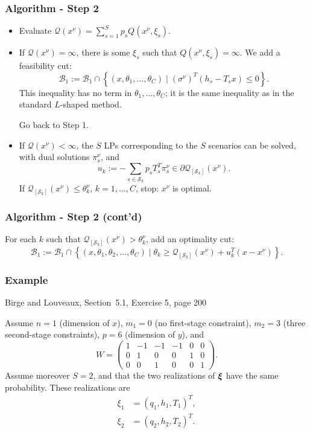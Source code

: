 \documentclass[aspectratio=169]{beamer}
\begin{document}
\begin{frame}
\frametitle{Algorithm - Step 2}

\begin{itemize}
\item
Evaluate $\mathcal{Q}(x^{\nu}) = \sum_{s = 1}^S p_s Q(x^{\nu}, \xi_s)$.
\item
If $\mathcal{Q}(x^{\nu}) = \infty$, there is some $\xi_s$ such that $Q(x^{\nu}, \xi_s) = \infty$.
We add a {\red feasibility cut}:
\[
\mathcal{B}_1 := \mathcal{B}_1 \cap \left\lbrace (x, \theta_1, \ldots, \theta_C) \mid
(\sigma^{\nu})^T(h_s-T_sx) \leq 0 \right\rbrace.
\]
This inequality has no term in $\theta_1, \ldots, \theta_C$; it is the same inequality as in the standard $L$-shaped method.

Go back to Step 1.
\item
If $\mathcal{Q}(x^{\nu}) < \infty$, the $S$ LPs corresponding to the $S$ scenarios can be solved, with dual solutions $\pi_s^{\nu}$, and
\[
u_k := -\sum_{s \in \mathcal{S}_k} p_s T_s^T\pi_s^{\nu}
\in \partial \mathcal{Q}_{[\mathcal{S}_k]}(x^{\nu}).
\]
If $\mathcal{Q}_{[\mathcal{S}_k]}(x^{\nu}) \leq \theta_k^{\nu}$, $k = 1,\ldots,C$, stop: $x^{\nu}$ is optimal.
\end{itemize}

\end{frame}

\begin{frame}
\frametitle{Algorithm - Step 2 (cont'd)}

For each $k$ such that $\mathcal{Q}_{[\mathcal{S}_k]}(x^{\nu}) > \theta_k^{\nu}$, add an optimality cut:
\[
\mathcal{B}_1 := \mathcal{B}_1 \cap \left\lbrace (x, \theta_1,
\theta_2,\ldots, \theta_C) \mid \theta_k \geq
\mathcal{Q}_{[\mathcal{S}_k]}(x^{\nu}) + u_k^T(x-x^{\nu}) \right\rbrace.
\]

\end{frame}

\begin{frame}
\frametitle{Example}

{\red Birge and Louveaux, Section~5.1, Exercise 5, page 200}

\mbox{}

Assume $n = 1$ (dimension of $x$), $m_1 = 0$ (no first-stage constraint), $m_2 = 3$ (three second-stage constraints), $p = 6$ (dimension of $y$), and
\[
W = \begin{pmatrix}
1 & -1 & -1 & -1 & 0 & 0 \\
0 & 1 & 0 & 0 & 1 & 0 \\
0 & 0 & 1 & 0 & 0 & 1
\end{pmatrix}.
\]
Assume moreover $S = 2$, and that the two realizations of ${\boldsymbol{\xi}}$ have the same probability.
These realizations are
\begin{align*}
\xi_1 &= (q_1, h_1, T_1)^T, \\
\xi_2 &= (q_2, h_2, T_2)^T.
\end{align*}

\end{frame}
\end{document}
